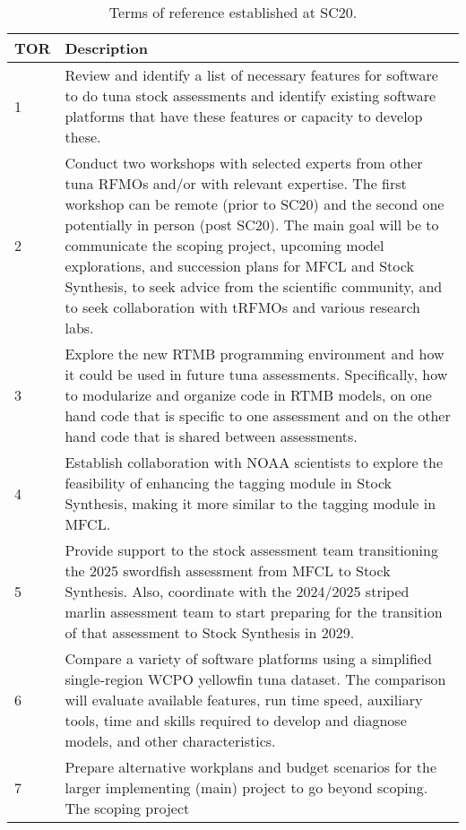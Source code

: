 \documentclass{SCreport}
\begin{document}
\begin{table}
  \renewcommand\arraystretch{1.25}
  \centering
  \caption{Terms of reference established at SC20.\label{tab:tors}}
  \begin{tabular}{p{1cm}p{13cm}}
    \hline
    TOR & Description\\
    \hline
    1 & Review and identify a list of necessary features for software to do tuna
        stock assessments and identify existing software platforms that have
        these features or capacity to develop these.\\
    \hline
    2 & Conduct two workshops with selected experts from other tuna RFMOs and/or
        with relevant expertise. The first workshop can be remote (prior to
        SC20) and the second one potentially in person (post SC20). The main
        goal will be to communicate the scoping project, upcoming model
        explorations, and succession plans for MFCL and Stock Synthesis, to seek
        advice from the scientific community, and to seek collaboration with
        tRFMOs and various research labs.\\
    \hline
    3 & Explore the new RTMB programming environment and how it could be used in
        future tuna assessments. Specifically, how to modularize and organize
        code in RTMB models, on one hand code that is specific to one assessment
        and on the other hand code that is shared between assessments.\\
    \hline
    4 & Establish collaboration with NOAA scientists to explore the feasibility
        of enhancing the tagging module in Stock Synthesis, making it more
        similar to the tagging module in MFCL.\\
    \hline
    5 & Provide support to the stock assessment team transitioning the 2025
        swordfish assessment from MFCL to Stock Synthesis. Also, coordinate with
        the 2024/2025 striped marlin assessment team to start preparing for the
        transition of that assessment to Stock Synthesis in 2029.\\
    \hline
    6 & Compare a variety of software platforms using a simplified single-region
        WCPO yellowfin tuna dataset. The comparison will evaluate available
        features, run time speed, auxiliary tools, time and skills required to
        develop and diagnose models, and other characteristics.\\
    \hline
    7 & Prepare alternative workplans and budget scenarios for the larger
        implementing (main) project to go beyond scoping. The scoping project

\end{tabular}
\end{table}
\end{document}

